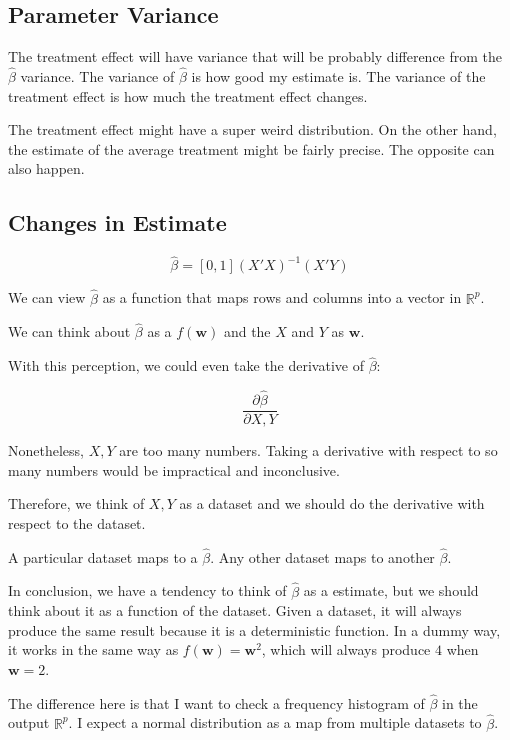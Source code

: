 \documentclass{article}
\begin{document}
\subsection{Parameter Variance}

The treatment effect will have variance that will be probably difference from the $\hat{\beta}$ variance. The variance of $\hat{\beta}$ is how good my estimate is. The variance of the treatment effect is how much the treatment effect changes.

The treatment effect might have a super weird distribution. On the other hand, the estimate of the average treatment might be fairly precise. The opposite can also happen.

\subsection{Changes in Estimate}

$$
\hat{\beta} = [0, 1] (X' X)^{-1} (X'Y)
$$

We can view $\hat{\beta}$ as a function that maps rows and columns into a vector in $\mathbb{R}^p$.

We can think about $\hat{\beta}$ as a $f(\textbf{w})$ and the $X$ and $Y$ as $\textbf{w}$.

With this perception, we could even take the derivative of $\hat{\beta}$:

$$
\frac{\partial \hat{\beta}}{\partial X, Y}
$$

Nonetheless, $X, Y$ are too many numbers. Taking a derivative with respect to so many numbers would be impractical and inconclusive.

Therefore, we think of $X, Y$ as a dataset and we should do the derivative with respect to the dataset.

A particular dataset maps to a $\hat{\beta}$. Any other dataset maps to another $\hat{\beta}$.

In conclusion, we have a tendency to think of $\hat{\beta}$ as a estimate, but we should think about it as a function of the dataset. Given a dataset, it will always produce the same result because it is a deterministic function. In a dummy way, it works in the same way as $f(\textbf{w}) = \textbf{w}^2$, which will always produce $4$ when $\textbf{w} = 2$.

The difference here is that I want to check a frequency histogram of $\hat{\beta}$ in the output $\mathbb{R}^p$. I expect a normal distribution as a map from multiple datasets to $\hat{\beta}$.
\end{document}
